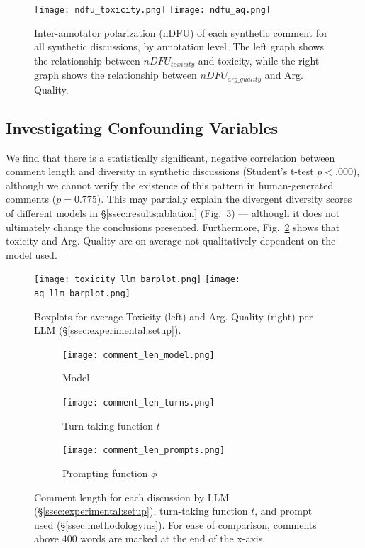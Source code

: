 \begin{figure}[t]
	\texttt{[image: ndfu\_toxicity.png]} \hfill
	\texttt{[image: ndfu\_aq.png]}
	\centering
	\caption{Inter-annotator polarization (nDFU) of each synthetic comment for all synthetic discussions, by annotation level. The left graph shows the relationship between $nDFU_{toxicity}$ and toxicity, while the right graph shows the relationship between $nDFU_{arg\_quality}$ and Arg. Quality.}
	\label{fig:ndfu_annot}
\end{figure}


\subsection{Investigating Confounding Variables}

We find that there is a statistically significant, negative correlation between comment length and diversity in synthetic discussions (Student's t-test  $p < .000$), although we cannot verify the existence of this pattern in human-generated comments ($p = 0.775$). This may partially explain the divergent diversity scores of different models in \S\ref{ssec:results:ablation}  (Fig.~\ref{fig:comment_length_model}) --- although it does not ultimately change the conclusions presented. Furthermore, Fig.~\ref{fig:toxicity_aq_model} shows that toxicity and Arg. Quality are on average not qualitatively dependent on the model used.

\begin{figure}[ht]
	\texttt{[image: toxicity\_llm\_barplot.png]} \hfill
	\texttt{[image: aq\_llm\_barplot.png]}
	\centering
	\caption{Boxplots for average Toxicity (left) and Arg. Quality (right) per LLM (\S\ref{ssec:experimental:setup}).}
	\label{fig:toxicity_aq_model}
\end{figure}

\begin{figure}[t]
	\begin{subfigure}{0.32\linewidth}
		\texttt{[image: comment\_len\_model.png]}
		\caption{Model}
		\label{fig:comment_length_model}
	\end{subfigure}%
	\hfill
	\begin{subfigure}{0.32\linewidth}
		\texttt{[image: comment\_len\_turns.png]}
		\caption{Turn-taking function $t$}
		\label{fig:comment_length_turns}
	\end{subfigure}%
	\hfill
	\begin{subfigure}{0.32\linewidth}
		\texttt{[image: comment\_len\_prompts.png]}
		\caption{Prompting function $\phi$}
		\label{fig:comment_length_prompts}
	\end{subfigure}%
	
	\caption{Comment length for each discussion by LLM (\S\ref{ssec:experimental:setup}), turn-taking function $t$, and prompt used (\S\ref{ssec:methodology:us}). For ease of comparison, comments above 400 words are marked at the end of the x-axis.}
	\label{fig:comment_length}
\end{figure}


